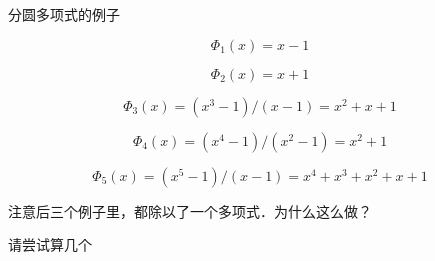 \begin{example}{分圆多项式的例子}\label{Cycltm_ex1}

\begin{equation}
\Phi_1(x) = x-1
\end{equation}

\begin{equation}
\Phi_2(x) = x+1
\end{equation}

\begin{equation}
\Phi_3(x) = (x^3-1)/(x-1) = x^2+x+1
\end{equation}

\begin{equation}
\Phi_4(x) = (x^4-1)/(x^2-1) = x^2+1
\end{equation}

\begin{equation}
\Phi_5(x) = (x^5-1)/(x-1) = x^4+x^3+x^2+x+1
\end{equation}

注意后三个例子里，都除以了一个多项式．为什么这么做？

\end{example}

\begin{exercise}{}
请尝试算几个
\end{exercise}














